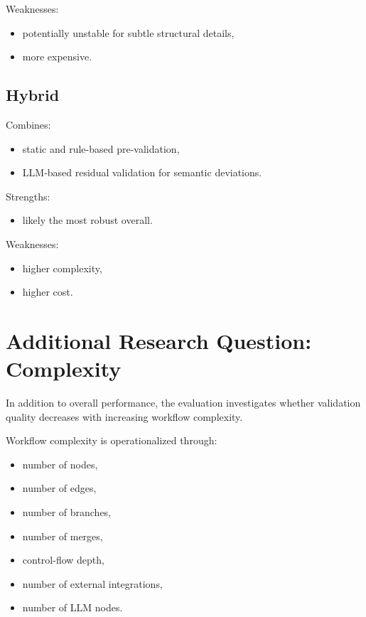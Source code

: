 \documentclass[12pt,a4paper]{article}
\begin{document}
Weaknesses:

\begin{itemize}
  \item potentially unstable for subtle structural details,
  \item more expensive.
\end{itemize}

\subsection{Hybrid}

Combines:

\begin{itemize}
  \item static and rule-based pre-validation,
  \item LLM-based residual validation for semantic deviations.
\end{itemize}

Strengths:

\begin{itemize}
  \item likely the most robust overall.
\end{itemize}

Weaknesses:

\begin{itemize}
  \item higher complexity,
  \item higher cost.
\end{itemize}

\section{Additional Research Question: Complexity}

In addition to overall performance, the evaluation investigates whether validation quality decreases with increasing workflow complexity.

Workflow complexity is operationalized through:

\begin{itemize}
  \item number of nodes,
  \item number of edges,
  \item number of branches,
  \item number of merges,
  \item control-flow depth,
  \item number of external integrations,
  \item number of LLM nodes.
\end{itemize}
\end{document}
